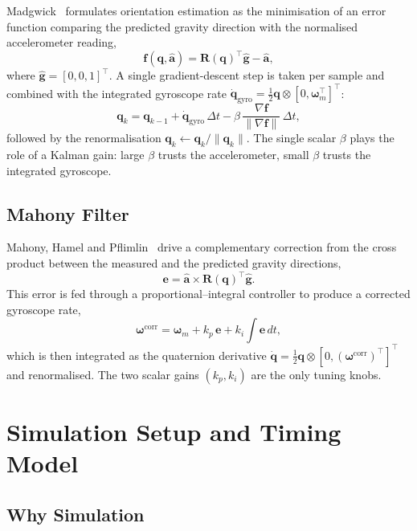 \documentclass[conference]{IEEEtran}
\newcommand{\bm}[1]{\mathbf{#1}}
\begin{document}
Madgwick~\cite{madgwick2010} formulates orientation estimation as
the minimisation of an error function comparing the predicted
gravity direction with the normalised accelerometer reading,
\begin{equation}
\bm{f}(\bm{q},\hat{\bm{a}}) = \bm{R}(\bm{q})^\top \hat{\bm{g}} - \hat{\bm{a}},
\end{equation}
where $\hat{\bm{g}} = [0,0,1]^\top$. A single gradient-descent
step is taken per sample and combined with the integrated
gyroscope rate $\dot{\bm{q}}_{\mathrm{gyro}} = \tfrac{1}{2}
\bm{q} \otimes [0,\boldsymbol{\omega}_m^\top]^\top$:
\begin{equation}
\bm{q}_k = \bm{q}_{k-1} + \dot{\bm{q}}_{\mathrm{gyro}}\,\Delta t
- \beta\,
\frac{\nabla \bm{f}}{\|\nabla \bm{f}\|}\,\Delta t,
\end{equation}
followed by the renormalisation $\bm{q}_k \leftarrow
\bm{q}_k / \|\bm{q}_k\|$. The single scalar $\beta$ plays the role
of a Kalman gain: large $\beta$ trusts the accelerometer, small
$\beta$ trusts the integrated gyroscope.

\subsection{Mahony Filter}

Mahony, Hamel and Pflimlin~\cite{mahony2008} drive a complementary
correction from the cross product between the measured and the
predicted gravity directions,
\begin{equation}
\bm{e} = \hat{\bm{a}} \times \bm{R}(\bm{q})^\top \hat{\bm{g}}.
\end{equation}
This error is fed through a proportional--integral controller to
produce a corrected gyroscope rate,
\begin{equation}
\boldsymbol{\omega}^{\mathrm{corr}} = \boldsymbol{\omega}_m
+ k_p\,\bm{e} + k_i\!\int \bm{e}\,dt,
\end{equation}
which is then integrated as the quaternion derivative
$\dot{\bm{q}} = \tfrac{1}{2}\bm{q} \otimes
[0,(\boldsymbol{\omega}^{\mathrm{corr}})^\top]^\top$ and
renormalised. The two scalar gains $(k_p, k_i)$ are the only
tuning knobs.

\section{Simulation Setup and Timing Model}\label{sec:setup}

\subsection{Why Simulation}
\end{document}
